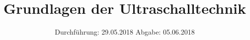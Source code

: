 
\usepackage{longtable}
\usepackage{wrapfig}
\usepackage{ dsfont }
\subject{VERSUCH US1}
\title{Grundlagen der Ultraschalltechnik}
\date{%
  \hspace{-2.5em}
  Durchführung: 29.05.2018
  \hspace{4em}
  Abgabe: 05.06.2018
}


  \setlength{\parindent}{0em}
  \maketitle
  \thispagestyle{empty}
  \newpage
  \tableofcontents
  \newpage








